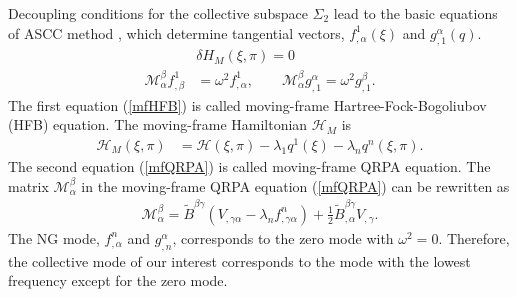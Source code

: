 \documentclass[%
superscriptaddress,
showpacs,
nofootinbib,
amsmath,amssymb,
aps,
prc,
twocolumn,
floatfix ]%
{revtex4-1}
\begin{document}
Decoupling conditions for the collective subspace $\Sigma_2$ lead to
the basic equations of ASCC method \cite{MNM00,N2012},
which determine tangential vectors,
$f^1_{,\alpha}(\xi)$ and $g_{,1}^{\alpha}(q)$.
\begin{align}
  &\delta H_M(\xi,\pi) = 0 \label{mfHFB} \\ 
\mathcal{M}^\beta_\alpha f^1_{,\beta}  &= \omega^2 f^1_{,\alpha},\hspace{2em} 
\mathcal{M}^\beta_\alpha g^{\alpha}_{,1} = \omega^2 g^{\beta}_{,1} .
  \label{mfQRPA}
\end{align}
The first equation (\ref{mfHFB}) is called moving-frame
Hartree-Fock-Bogoliubov (HFB) equation.
The moving-frame Hamiltonian $\mathcal{H}_M$
is
\begin{align}
\mathcal{H}_M(\xi,\pi) &= \mathcal{H}(\xi,\pi)
	-\lambda_{1} q^1(\xi) - \lambda_{n} q^n(\xi,\pi) .
\end{align}
The second equation (\ref{mfQRPA}) is called moving-frame QRPA equation.
The matrix $\mathcal{M}^\beta_\alpha$ in the moving-frame QRPA
equation (\ref{mfQRPA}) can be rewritten as 
 \begin{align}
\mathcal{M}^{\beta}_{\alpha} =
	 \tilde{B}^{\beta\gamma}
	 \left(V_{,\gamma\alpha}-\lambda_{n}f^n_{,\gamma\alpha}\right)
	+ \frac{1}{2}\tilde{B}^{\beta\gamma}_{,\alpha}V_{,\gamma} 
\label{M}.
\end{align}
The NG mode, $f^n_{,\alpha}$ and $g^\alpha_{,n}$, corresponds to
the zero mode with $\omega^2=0$.
Therefore, the collective mode of our interest corresponds to
the mode with the lowest frequency except for the zero mode.
\end{document}
